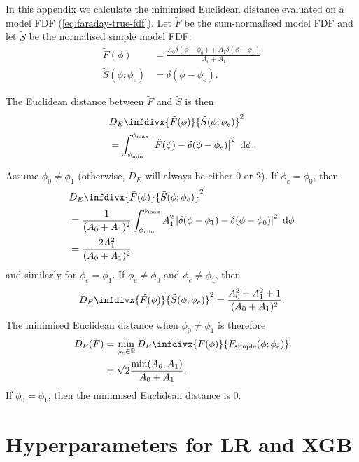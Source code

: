   In this appendix we calculate the minimised Euclidean distance evaluated on a model FDF (\autoref{eq:faraday-true-fdf}). Let $\tilde F$ be the sum-normalised model FDF and let $\tilde S$ be the normalised simple model FDF:
  \begin{align}
    \tilde F(\phi) &= \frac{A_0 \delta(\phi - \phi_0) + A_1 \delta(\phi - \phi_1)}{A_0 + A_1}\\
    \tilde S(\phi; \phi_e) &= \delta(\phi - \phi_e).
  \end{align}

  The Euclidean distance between $\tilde F$ and $\tilde S$ is then
  \begin{align}
    &D_E\infdivx{\tilde F(\phi)}{\tilde S(\phi; \phi_e)}^2\\
    &= \int_{\phi_{\min}}^{\phi_{\max}} \left|\tilde F(\phi) - \delta(\phi - \phi_e) \right|^2\ \mathrm{d}\phi.
  \end{align}

  Assume $\phi_0 \neq \phi_1$ (otherwise, $D_E$ will always be either $0$ or $2$). If $\phi_e = \phi_0$, then
  \begin{align}
    &D_E\infdivx{\tilde F(\phi)}{\tilde S(\phi; \phi_e)}^2\\
      &= \frac{1}{(A_0 + A_1)^2} \int_{\phi_{\min}}^{\phi_{\max}} A_1^2 \left|\delta(\phi - \phi_1) - \delta(\phi - \phi_0) \right|^2\ \mathrm{d}\phi\\
      &= \frac{2 A_1^2}{(A_0 + A_1)^2}
  \end{align}
  and similarly for $\phi_e = \phi_1$. If $\phi_e \neq \phi_0$ and $\phi_e \neq \phi_1$, then
  \begin{equation}
    D_E\infdivx{\tilde F(\phi)}{\tilde S(\phi; \phi_e)}^2 = \frac{A_0^2 + A_1^2 + 1}{(A_0 + A_1)^2}.
  \end{equation}
  The minimised Euclidean distance when $\phi_0 \neq \phi_1$ is therefore
  \begin{align}
      D_E(F) &= \min_{\phi_e \in \mathbb{R}} D_E\infdivx{F(\phi)}{F_{\mathrm{simple}}(\phi; \phi_e)}\\
          &= \sqrt{2} \frac{\min(A_0, A_1)}{A_0 + A_1}.
  \end{align}
  If $\phi_0 = \phi_1$, then the minimised Euclidean distance is 0.

\section{Hyperparameters for LR and XGB}
\label{sec:faraday-hyperparameters}


